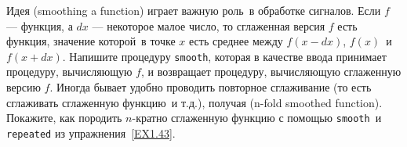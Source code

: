 \begin{exercise}{1.44}\label{EX1.44}%
%
% 
% 
%
Идея  (smoothing a function) играет 
важную роль~в обработке сигналов.  Если $f$ --- функция, а
$dx$ --- некоторое малое число, то сглаженная версия
$f$ есть функция, значение которой~в точке $x$
есть среднее между $f (x-dx)$, $f(x)$~и $f
(x+dx)$. Напишите процедуру {\tt smooth}, которая в
качестве ввода принимает процедуру, вычисляющую $f$, и
возвращает процедуру, вычисляющую сглаженную версию $f$.
Иногда бывает удобно проводить повторное сглаживание (то есть
сглаживать сглаженную функцию~и т.д.), получая  (n-fold smoothed function).
Покажите, как породить $n$-кратно сглаженную функцию с
помощью {\tt smooth}~и {\tt repeated} из 
упражнения~\ref{EX1.43}.
\end{exercise}
